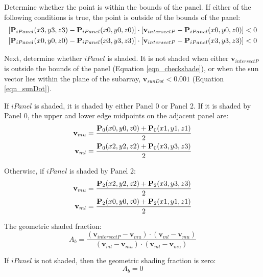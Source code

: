 \documentclass[12pt,letterpaper]{article}
\begin{document}
Determine whether the point is within the bounds of the panel. If either of the following conditions is true, the point is outside of the bounds of the panel:
\begin{align}\label{eqn_checkshade}
[\mathbf{P}_{iPanel}(x3,y3,z3)-\mathbf{P}_{iPanel}(x0,y0,z0)]\cdot
[\mathbf{v}_{intersectP}-\mathbf{P}_{iPanel}(x0,y0,z0)] <0\notag\\
[\mathbf{P}_{iPanel}(x0,y0,z0)-\mathbf{P}_{iPanel}(x3,y3,z3)]\cdot
[\mathbf{v}_{intersectP}-\mathbf{P}_{iPanel}(x3,y3,z3)] <0
\end{align}

Next, determine whether $\mathit{iPanel}$ is shaded. It is not shaded when either $\mathbf{v}_{intersectP}$ is outside the bounds of the panel (Equation \ref{eqn_checkshade}), or when the sun vector lies within the plane of the subarray, $\mathbf{v}_{sunDot}<0.001$ (Equation \ref{eqn_sunDot}). 

If $\mathit{iPanel}$ is shaded, it is shaded by either Panel 0 or Panel 2. If it is shaded by Panel 0, the upper and lower edge midpoints on the adjacent panel are: 
\begin{align}
\mathbf{v}_{mu}=\frac{\mathbf{P}_{0}(x0,y0,z0) + \mathbf{P}_{0}(x1,y1,z1)}{2}\notag\\
\mathbf{v}_{ml} =\frac{\mathbf{P}_{0}(x2,y2,z2) + \mathbf{P}_{0}(x3,y3,z3)}{2}
\end{align}

Otherwise, if $\mathit{iPanel}$ is shaded by Panel 2: 
\begin{align}
\mathbf{v}_{mu}=\frac{\mathbf{P}_{2}(x2,y2,z2) + \mathbf{P}_{2}(x3,y3,z3)}{2}\notag\\
\mathbf{v}_{ml} =\frac{\mathbf{P}_{2}(x0,y0,z0) + \mathbf{P}_{2}(x1,y1,z1)}{2}
\end{align}

The geometric shaded fraction:
\begin{equation}\label{eqn_1xshadfrac}
A_b = \frac{ (\mathbf{v}_{intersectP}-\mathbf{v}_{mu})  \cdot (\mathbf{v}_{ml}-\mathbf{v}_{mu})}{(\mathbf{v}_{ml}-\mathbf{v}_{mu})\cdot (\mathbf{v}_{ml}-\mathbf{v}_{mu})}
\end{equation}

If $\mathit{iPanel}$ is not shaded, then the geometric shading fraction is zero:
\begin{equation}
A_b = 0
\end{equation}
\end{document}
